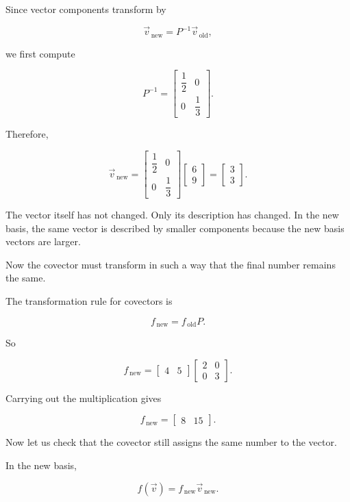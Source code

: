 \documentclass[11pt,openany]{book}
\theoremstyle{definition}
\begin{document}
Since vector components transform by

\[
\vec{v}_{\,\text{new}} = P^{-1}\vec{v}_{\,\text{old}},
\]

we first compute

\[
P^{-1}
=
\begin{bmatrix}
\dfrac{1}{2} & 0 \\
0 & \dfrac{1}{3}
\end{bmatrix}.
\]

Therefore,

\[
\vec{v}_{\,\text{new}}
=
\begin{bmatrix}
\dfrac{1}{2} & 0 \\
0 & \dfrac{1}{3}
\end{bmatrix}
\begin{bmatrix}
6 \\
9
\end{bmatrix}
=
\begin{bmatrix}
3 \\
3
\end{bmatrix}.
\]

The vector itself has not changed. Only its description has changed. In the new
basis, the same vector is described by smaller components because the new basis
vectors are larger.

\medskip

Now the covector must transform in such a way that the final number remains the
same.

The transformation rule for covectors is

\[
f_{\,\text{new}} = f_{\,\text{old}}P.
\]

So

\[
f_{\,\text{new}}
=
\begin{bmatrix}
4 & 5
\end{bmatrix}
\begin{bmatrix}
2 & 0 \\
0 & 3
\end{bmatrix}.
\]

Carrying out the multiplication gives

\[
f_{\,\text{new}}
=
\begin{bmatrix}
8 & 15
\end{bmatrix}.
\]

Now let us check that the covector still assigns the same number to the vector.

In the new basis,

\[
f(\vec{v})
=
f_{\,\text{new}}\vec{v}_{\,\text{new}}.
\]
\end{document}
